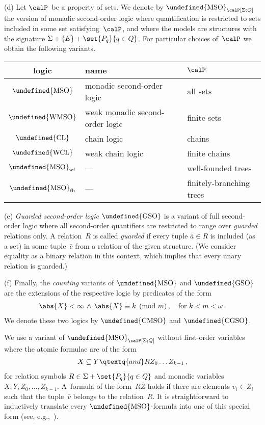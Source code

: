 \documentclass[10pt, fleqn]{scrartcl}
\makeatletter
\newcommand\m@thsm@ller[2]{\mbox{\relscale{0.91}$\m@th#1#2$}}
\let\smaller\undefined
\DeclareRobustCommand\smaller[1]{\relax\ifmmode{\mathpalette\m@thsm@ller{#1}}\else{\relscale{0.91}#1}\fi}
\newcommand*{\WMSO}{\smaller{\mathrm{WMSO}}}
\newcommand*{\MSO}{\smaller{\mathrm{MSO}}}
\newcommand*{\GSO}{\smaller{\mathrm{GSO}}}
\newcommand*{\CMSO}{\smaller{\mathrm{CMSO}}}
\newcommand*{\CGSO}{\smaller{\mathrm{CGSO}}}
\newcommand*{\CL}{\smaller{\mathrm{CL}}}
\newcommand*{\WCL}{\smaller{\mathrm{WCL}}}
\newcommand*{\?}{\kern .08em}
\makeatother
\begin{document}
\begin{Def}
(d) Let $\calP$~be a property of sets.
We denote by $\MSO_\calP[\Sigma;Q]$ the version of monadic second-order logic where
quantification is restricted to sets included in some set satisfying~$\calP$,
and where the models are structures with the signature $\Sigma + \{E\} + \set{ P_q }{ q \in Q }$.
For particular choices of~$\calP$ we obtain the following variants.

\medskip
{\noindent\centering
\begin{tabular}{cll}
\toprule
  logic   & name & $\calP$ \\
\midrule
  $\MSO$  &monadic second-order logic      & all sets \\
  $\WMSO$ &weak monadic second-order logic & finite sets \\
  $\CL$   &chain logic                     & chains \\
  $\WCL$  &weak chain logic                & finite chains \\
  $\MSO_{\mathrm{wf}}$ &---                & well-founded trees \\
  $\MSO_{\mathrm{fb}}$ &---                & finitely-branching trees \\
\bottomrule
\end{tabular}
\par}

\medskip
(e) \emph{Guarded second-order logic} $\GSO$ is a variant of full second-order logic where
all second-order quantifiers are restricted to range over \emph{guarded} relations only.
A relation~$R$ is called \emph{guarded} if every tuple $\bar a \in R$ is included (as a set)
in some tuple~$\bar c$ from a relation of the given structure. (We consider equality as a
binary relation in this context, which implies that every unary relation is guarded.)

(f) Finally, the \emph{counting} variants of $\MSO$ and $\GSO$ are the extensions
of the respective logic by predicates of the form
\begin{align*}
  \abs{X} < \infty \,\land\, \abs{X} \equiv k \pmod m\,,
  \quad\text{for } k < m < \omega\,.
\end{align*}
We denote these two logics by $\CMSO$ and $\CGSO$.
\end{Def}

We use a variant of $\MSO_\calP[\Sigma;Q]$ without first-order variables
where the atomic formulae are of the form
\begin{align*}
  X \subseteq Y
  \qtextq{and}
  RZ_0\dots Z_{k-1}\,,
\end{align*}
for relation symbols $R \in \Sigma + \set{ P_q }{ q \in Q }$ and monadic variables
$X,Y,Z_0,\dots,Z_{k-1}$. A~formula of the form~$R\bar Z$ holds if there are elements
$v_i \in Z_i$ such that the tuple~$\bar v$ belongs to the relation~$R$.
It is straightforward to inductively translate every $\MSO$-formula into one of this
special form (see, e.g.,~\cite{Thomas97,BlumensathLN1}).
\end{document}
